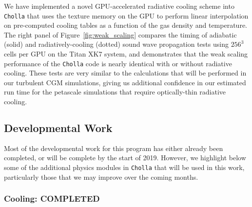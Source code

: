 \documentclass[11pt,letterpaper,english]{article}
\begin{document}
We have implemented a novel GPU-accelerated radiative cooling scheme into {\tt Cholla} that uses the texture memory on the GPU
to perform linear interpolation on pre-computed cooling tables as a function of the gas density and temperature. The right
panel of Figure~\ref{fig:weak_scaling} compares the timing of adiabatic (solid) and radiatively-cooling (dotted) sound wave
propagation tests using $256^3$ cells per GPU on the Titan XK7 system, and demonstrates that the weak scaling performance
of the {\tt Cholla} code is nearly identical with or without radiative cooling. These tests are very similar to the calculations that will be performed 
in our turbulent CGM simulations, giving us additional confidence in our estimated run time for the petascale simulations that require optically-thin radiative cooling.


\vspace{-.25in}
\subsection{Developmental Work}
\vspace{-.2in}

Most of the developmental work for this program has either already been completed, or will be complete by the start of 2019. However, we highlight below some of the additional physics modules in {\tt Cholla} that will be used in this work, particularly those that we may improve over the coming months.

\vspace{-.2in}
\subsubsection{Cooling: COMPLETED}
\vspace{-.25in}
\end{document}

